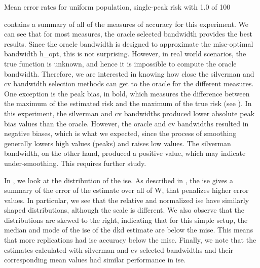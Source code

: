 \begin{table}[htbp]
    \centering
    
    \caption{Mean error rates for uniform population, single-peak risk with  1.0 of  100}
    \label{tab:errors:unif_100_1.0_1h}
\end{table}

 contains a summary of all of the measures of accuracy for this experiment.
We can see that for most measures, the \gls{oracle} selected bandwidth provides the best results.
Since the \gls{oracle} bandwidth is designed to approximate the \gls{mise}-optimal bandwidth \gls{h_opt},
this is not surprising.
However, in real world scenarios, the true function is unknown, and hence it is impossible to compute the \gls{oracle} bandwidth.
Therefore, we are interested in knowing how close the \gls{silverman} and \gls{cv} bandwidth selection methods can get to the \gls{oracle} for the different measures.
One exception is the \gls{peak bias}, in bold,
which measures the difference between the maximum of the estimated risk and the maximum of the true risk (see ).
In this experiment,
the \gls{silverman} and \gls{cv} bandwidths produced lower absolute \gls{peak bias} values than the \gls{oracle}. 
However, the \gls{oracle} and \gls{cv} bandwidths resulted in negative biases,
which is what we expected,
since the process of smoothing generally lowers high values (peaks) and raises low values.
The \gls{silverman} bandwidth, on the other hand, produced a positive value,
which may indicate under-smoothing.
This requires further study.

In , we look at the distribution of the \gls{ise}.
As described in ,
the \gls{ise} gives a summary of the error of the estimate over all of \gls{W},
that penalizes higher error values.
In particular, we see that the relative and normalized \gls{ise} have similarly shaped distributions, although the scale is different.
We also observe that the distributions are skewed to the right,
indicating that for this simple setup,
the median and mode of the \gls{ise} of the \gls{dkd} estimate are below the \gls{mise}.
This means that more replications had \gls{ise} accuracy below the \gls{mise}.
Finally, we note that the estimates calculated with \gls{silverman} and \gls{cv}
selected bandwidths and their corresponding mean values had similar performance in \gls{ise}.

